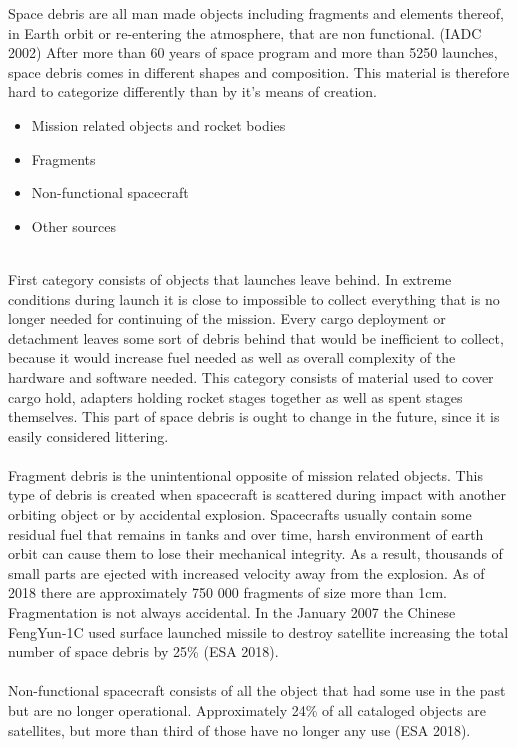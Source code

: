\documentclass[12pt, a4paper, oneside]{book}
\begin{document}
Space debris are all man made objects including fragments and elements thereof, in Earth orbit or re-entering the atmosphere, that are non functional. (IADC 2002)
After more than 60 years of space program and more than 5250 launches, space debris comes in different shapes and composition.
This material is therefore hard to categorize differently than by it's means of creation. \\
\begin{itemize}
    \item Mission related objects and rocket bodies
    \item Fragments
    \item Non-functional spacecraft
    \item Other sources
\end{itemize}
\\
    First category consists of objects that launches leave behind.
In extreme conditions during launch it is close to impossible to collect everything that is no longer needed for continuing of the mission.
Every cargo deployment or detachment leaves some sort of debris behind that would be inefficient to collect, because it would increase fuel needed as well as overall complexity of the hardware and software needed.
This category consists of material used to cover cargo hold, adapters holding rocket stages together as well as spent stages themselves.
This part of space debris is ought to change in the future, since it is easily considered littering.\\
\\
    Fragment debris is the unintentional opposite of mission related objects.
This type of debris is created when spacecraft is scattered during impact with another orbiting object or by accidental explosion.
Spacecrafts usually contain some residual fuel that remains in tanks and over time, harsh environment of earth orbit can cause them to lose their mechanical integrity.
As a result, thousands of small parts are ejected with increased velocity away from the explosion.
As of 2018 there are approximately 750 000 fragments of size more than 1cm.
Fragmentation is not always accidental. In the January 2007 the Chinese FengYun-1C used surface launched missile to destroy satellite increasing the total number of space debris by 25\% (ESA 2018).\\
\\
    Non-functional spacecraft consists of all the object that had some use in the past but are no longer operational.
Approximately 24\% of all cataloged objects are satellites, but more than third of those have no longer any use (ESA 2018).
\end{document}
